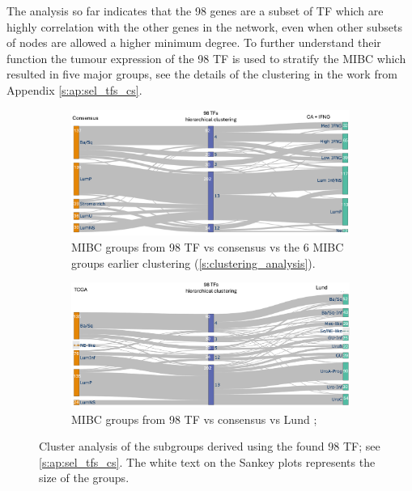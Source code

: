 The analysis so far indicates that the 98 genes are a subset of TF which are highly correlation with the other genes in the network, even when other subsets of nodes are allowed a higher minimum degree. To further understand their function the tumour expression of the 98 TF is used to stratify the MIBC which resulted in five major groups, see the details of the clustering in the work from Appendix \cref{s:ap:sel_tfs_cs}.

\begin{figure}[!htb]
    \centering
    \begin{subfigure}[!t]{1.0\textwidth}
        \includegraphics[width=1.0\textwidth,keepaspectratio]{Sections/Network_I/Resources/selective_pruning/sel_tfs/sankey_sel_tfs_VU_CS.png}
        \caption{MIBC groups from 98 TF vs consensus \citep{Kamoun2020-tj} vs the 6 MIBC groups earlier clustering (\ref{s:clustering_analysis}).}
        \label{fig:N_I:sankey_sel_tfs_vuCs}
    \end{subfigure}
    \begin{subfigure}[!t]{1.0\textwidth}
        \includegraphics[width=1.0\textwidth,keepaspectratio]{Sections/Network_I/Resources/selective_pruning/sel_tfs/sankey_sel_tfs.png}
        \caption{MIBC groups from 98 TF vs consensus \citep{Kamoun2020-tj} vs Lund \citep{Marzouka2018-ge};}
        \label{fig:N_I:sankey_sel_tfs}
    \end{subfigure}
    \caption[MIBC found from the 98 TF]{Cluster analysis of the subgroups derived using the found 98 TF; see \cref{s:ap:sel_tfs_cs}. The white text on the Sankey plots represents the size of the groups. }
    \label{fig:N_I:sel_tfs_cs_analysis}
\end{figure}


